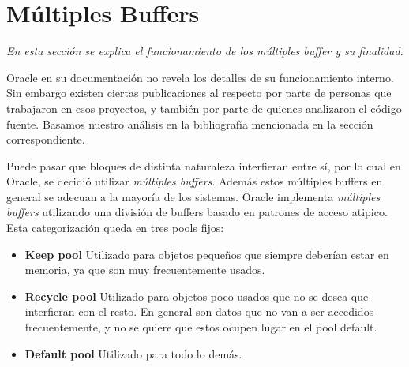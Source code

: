 \section{Múltiples Buffers}

\textsl{En esta secci\'on se explica el funcionamiento de los
múltiples buffer y su finalidad.}

\vspace*{0.5cm}

Oracle en su documentaci\'on no revela los detalles de su funcionamiento 
interno. 
Sin embargo existen ciertas publicaciones al respecto por parte de 
personas que trabajaron en esos proyectos, y tambi\'en por parte de 
quienes analizaron el c\'odigo fuente.
Basamos nuestro análisis en la bibliografía mencionada en la 
sección correspondiente.

\vspace*{0.5cm}

Puede pasar que bloques de distinta naturaleza interfieran entre sí, por lo 
cual en Oracle, se decidió utilizar \textit{m\'ultiples buffers}. Además 
estos múltiples buffers en general se adecuan a la mayoría de los sistemas.
Oracle implementa \textit{m\'ultiples buffers} utilizando una división de 
buffers basado en patrones de acceso atipico. Esta categorización queda en
tres pools fijos:

\begin{itemize}
  \item \textbf{Keep pool}
    Utilizado para objetos pequeños que siempre deber\'ian estar en memoria, 
    ya que son muy frecuentemente usados.

  \item \textbf{Recycle pool}
    Utilizado para objetos poco usados que no se desea que interfieran 
    con el resto. En general son datos que no van a ser accedidos 
    frecuentemente, y no se quiere que estos ocupen lugar en el pool default.

  \item \textbf{Default pool} 
    Utilizado para todo lo dem\'as.
\end{itemize}



